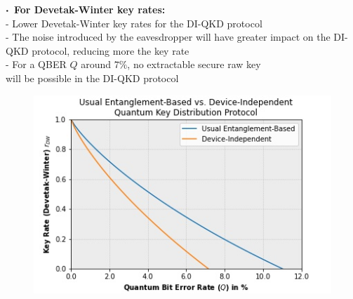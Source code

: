 \documentclass{beamer}
\newcommand\sbullet[1][.5]{\mathbin{\vcenter{\hbox{\scalebox{#1}{$\bullet$}}}}}
\begin{document}
\begin{frame}
\begin{minipage}{0.5\textwidth}
\begin{figure}
                \caption{\color{blue}{Figure 3: }\color{black}{Holevo bounds with respect to QBER $Q$}}
                \end{figure}
            \end{minipage}%
            \begin{minipage}{0.5\textwidth}
                \centering
                \vspace{0.5ex}
                \scriptsize $\sbullet$\, \textbf{For Devetak-Winter key rates:}\\
                \vspace{0.25ex}
                \tiny
                - Lower Devetak-Winter key rates for the DI-QKD protocol\\
                - The noise introduced by the eavesdropper will have greater impact on the DI-QKD protocol, reducing more the key rate\\
                - For a QBER $Q$ around $7\%$, no extractable secure raw key\\ will be possible in the DI-QKD protocol
                \vspace{-1.2ex}
                \begin{figure}
                    \includegraphics[width=\linewidth]{figures/presentation/jpg/key-rates-bounds-quantum-bit-error-rate-plot.jpg}
                    \vspace{-4ex}
                    \caption{\color{blue}{Figure 4: }\color{black}{Devetak-Winter key rates with respect to QBER $Q$}}
                \end{figure}
            \end{minipage}
            
		\end{frame}
\end{document}
